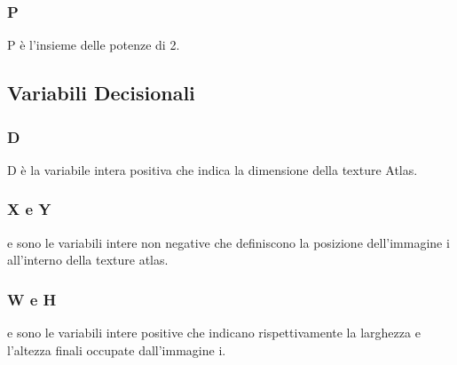 \subsubsection{P}
P è l'insieme delle potenze di 2.





\newcommand{\footBleeding}{L'effetto bleeding si può manifestare nei programmi che sfruttano l'accelerazione hardware. In essi i pixel vengono presi con delle coordinate reali in [0,1] e i pixel subito fuori dall'immagine possono "sporcare" quelli di contorno. Perciò si ricopiano questi ultimi in un bordo di 1 pixel attorno a tutta l'immagine.}
\newcommand{\footRotation}{Alcuni programmi (soprattutto quelli che sfruttano l'accelerazione hardware) possono disegnare le texture in modo esatto anche se sull'immagine originaria sono ruotate, mentre altri potrebbero avere delle difficoltà.}
\newcommand{\footTwoPowers}{Alcune librerie spesso esigono immagini quadrate il cui lato dev'essere una potenza di 2.}

\newcommand{\footFreedom}{L'utente in realtà ha la libertà di usare queste variabili per mettere valori a piacere, non necessariamente potenze di 2.}

\newcommand{\footIsTSum}{Essendo variabili di uguaglianza su una stessa variabile D, questa somma può essere al massimo 1.}





\subsection{Variabili Decisionali}

\subsubsection{D}
D è la variabile intera positiva che indica la dimensione della texture Atlas.

\subsubsection{X e Y}
\Xi{} e \Yi{} sono le variabili intere non negative che definiscono la posizione dell'immagine i all'interno della texture atlas.

\subsubsection{W e H}
\Wi{} e \Hi{} sono le variabili intere positive che indicano rispettivamente la larghezza e l'altezza finali occupate dall'immagine i.



